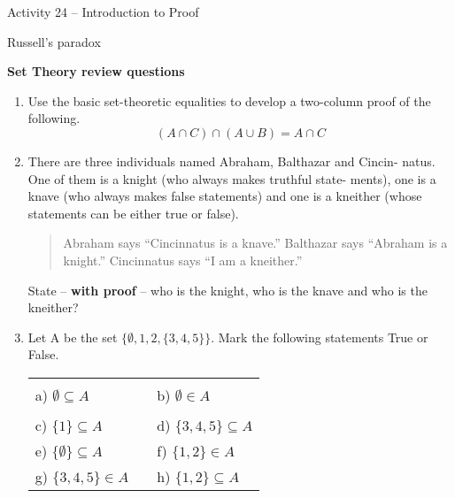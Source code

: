 \documentclass{amsart}
\begin{document}
\thispagestyle{empty}

\centerline{\Large Activity 24 -- Introduction to Proof}
\centerline{\large Russell's paradox}

\bigskip
\Large

{\bf \large Set Theory review questions}
\begin{enumerate}

\item Use the basic set-theoretic equalities to develop a two-column proof
of the following.
\[
(A \cap C) \cap (A  \cup  B) = A \cap C
\]

\vfill

\item There are three individuals named Abraham, Balthazar and Cincin-
natus.  One of them is a knight (who always makes truthful state-
ments), one is a knave (who always makes false statements) and
one is a kneither (whose statements can be either true or false).
\medskip

\begin{quotation}
Abraham says “Cincinnatus is a knave.”\newline
Balthazar says “Abraham is a knight.” \newline
Cincinnatus says “I am a kneither.” \newline
\end{quotation}

State – {\bf with proof} – who is the knight, who is the knave and
who is the kneither?

\vfill

\newpage

\item Let A be the set $\{\emptyset, 1, 2, \{3, 4, 5\}\}$.  Mark the following statements \newline
True or False.

\begin{tabular}{lcl}
\rule{0pt}{84pt} a)  $ \emptyset \subseteq A $ & \rule{1.5in}{0in} & b)  $\emptyset \in A$\\
\rule{0pt}{84pt} c) $ \{1\}  \subseteq  A $ & & d) $\{3, 4, 5\}  \subseteq  A$\\
\rule{0pt}{84pt} e) $ \{ \emptyset \}  \subseteq  A $  & & f) $\{1, 2\}  \in  A$\\
\rule{0pt}{84pt} g) $ \{3, 4, 5\}  \in  A $ & & h) $\{1, 2\}  \subseteq  A$\\
\end{tabular}

\rule{0pt}{84pt}


\end{enumerate}
\end{document}
